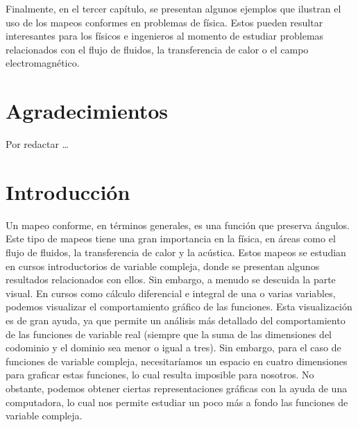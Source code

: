\documentclass[letterpaper,12pt,openany]{book}
\theoremstyle{definition}
\theoremstyle{definition}
\theoremstyle{definition}
\theoremstyle{definition}
\theoremstyle{definition}
\theoremstyle{remark}
\theoremstyle{definition}
\begin{document}
	Finalmente, en el tercer capítulo, se presentan algunos ejemplos que ilustran el uso de los mapeos conformes en problemas de física. Estos pueden resultar interesantes para los físicos e ingenieros al momento de estudiar problemas relacionados con el flujo de fluidos, la transferencia de calor o el campo electromagnético.
	\chapter*{Agradecimientos}
	
	Por redactar \ldots
	
	\tableofcontents
	 
	\listoffigures
	
	\chapter*{Introducción}
	Un mapeo conforme, en términos generales, es una función que preserva ángulos. Este tipo de mapeos tiene una gran importancia en la física, en áreas como el flujo de fluidos, la transferencia de calor y la acústica. Estos mapeos se estudian en cursos introductorios de variable compleja, donde se presentan algunos resultados relacionados con ellos. Sin embargo, a menudo se descuida la parte visual. En cursos como cálculo diferencial e integral de una o varias variables, podemos visualizar el comportamiento gráfico de las funciones. Esta visualización es de gran ayuda, ya que permite un análisis más detallado del comportamiento de las funciones de variable real (siempre que la suma de las dimensiones del codominio y el dominio sea menor o igual a tres). Sin embargo, para el caso de funciones de variable compleja, necesitaríamos un espacio en cuatro dimensiones para graficar estas funciones, lo cual resulta imposible para nosotros. No obstante, podemos obtener ciertas representaciones gráficas con la ayuda de una computadora, lo cual nos permite estudiar un poco más a fondo las funciones de variable compleja.
	
\end{document}
